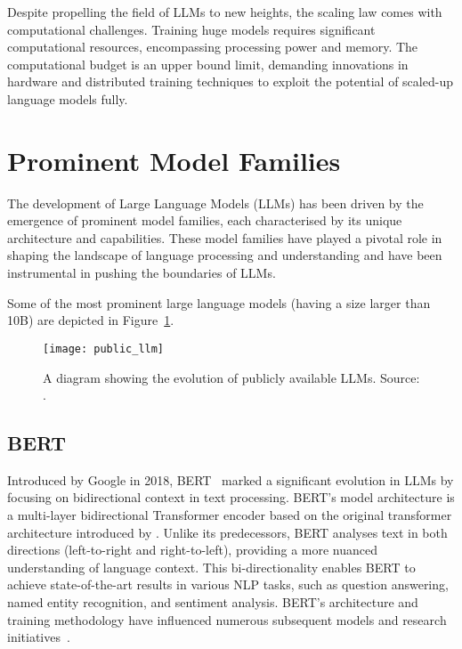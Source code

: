 Despite propelling the field of LLMs to new heights, the scaling law comes with computational challenges.
Training huge models requires significant computational resources, encompassing processing power and memory.
The computational budget is an upper bound limit, demanding innovations in hardware and distributed training techniques to exploit the potential of scaled-up language models fully.

\section{Prominent Model Families}
\label{sec:promiment-model-families}

The development of Large Language Models (LLMs) has been driven by the emergence of prominent model families, each characterised by its unique architecture and capabilities.
These model families have played a pivotal role in shaping the landscape of language processing and understanding and have been instrumental in pushing the boundaries of LLMs.

Some of the most prominent large language models (having a size larger than 10B) are depicted in Figure~\ref{fig:llm-evolution}.

\begin{figure}[h!]
	\centering
	\texttt{[image: public\_llm]}
	\caption{A diagram showing the evolution of publicly available LLMs. Source: \textcite{survey}.}
	\label{fig:llm-evolution}
\end{figure}

\subsection{BERT}
\label{subsec:bert}

Introduced by Google in 2018, BERT~\cite{devlin2019bert} marked a significant evolution in LLMs by focusing on bidirectional context in text processing.
BERT's model architecture is a multi-layer bidirectional Transformer encoder based on the original transformer architecture introduced by \textcite{vaswani2023attention}.
Unlike its predecessors, BERT analyses text in both directions (left-to-right and right-to-left), providing a more nuanced understanding of language context.
This bi-directionality enables BERT to achieve state-of-the-art results in various NLP tasks, such as question answering, named entity recognition, and sentiment analysis.
BERT's architecture and training methodology have influenced numerous subsequent models and research initiatives~\cite{devlin2019bert}.

